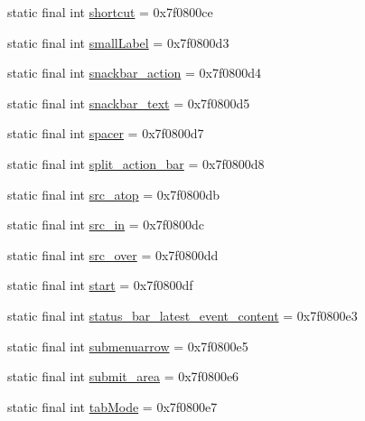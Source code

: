 \begin{DoxyCompactItemize}
static final int \mbox{\hyperlink{classandroid_1_1support_1_1design_1_1_r_1_1id_a9e39fbfaefbdc10d69bb31d13bf4959c}{shortcut}} = 0x7f0800ce
\item 
static final int \mbox{\hyperlink{classandroid_1_1support_1_1design_1_1_r_1_1id_ad269a4dcba96e834b17c3eb9e1900474}{small\+Label}} = 0x7f0800d3
\item 
static final int \mbox{\hyperlink{classandroid_1_1support_1_1design_1_1_r_1_1id_a073bc2a75a5089a68ae23abebbdb13f6}{snackbar\+\_\+action}} = 0x7f0800d4
\item 
static final int \mbox{\hyperlink{classandroid_1_1support_1_1design_1_1_r_1_1id_a1ac0d96909145afa11cdd3489a7adfb0}{snackbar\+\_\+text}} = 0x7f0800d5
\item 
static final int \mbox{\hyperlink{classandroid_1_1support_1_1design_1_1_r_1_1id_a29506b5ea15ea1e16972548834bfc1d9}{spacer}} = 0x7f0800d7
\item 
static final int \mbox{\hyperlink{classandroid_1_1support_1_1design_1_1_r_1_1id_a6a714dbfce5b2bd17ac6888b45bab492}{split\+\_\+action\+\_\+bar}} = 0x7f0800d8
\item 
static final int \mbox{\hyperlink{classandroid_1_1support_1_1design_1_1_r_1_1id_a07a92f1e2e517cc2410d6b29d15e61dd}{src\+\_\+atop}} = 0x7f0800db
\item 
static final int \mbox{\hyperlink{classandroid_1_1support_1_1design_1_1_r_1_1id_a7561532289295b8b13fecd179ea90562}{src\+\_\+in}} = 0x7f0800dc
\item 
static final int \mbox{\hyperlink{classandroid_1_1support_1_1design_1_1_r_1_1id_a736f123ee86e4183fcfb8bd3022ba9b8}{src\+\_\+over}} = 0x7f0800dd
\item 
static final int \mbox{\hyperlink{classandroid_1_1support_1_1design_1_1_r_1_1id_a0d737859bafd47bd0319c24213bf40ba}{start}} = 0x7f0800df
\item 
static final int \mbox{\hyperlink{classandroid_1_1support_1_1design_1_1_r_1_1id_a64ae3efa15896f2f8faa162f61413ed1}{status\+\_\+bar\+\_\+latest\+\_\+event\+\_\+content}} = 0x7f0800e3
\item 
static final int \mbox{\hyperlink{classandroid_1_1support_1_1design_1_1_r_1_1id_a09a95220083150a53dbebd8a8b21e4e1}{submenuarrow}} = 0x7f0800e5
\item 
static final int \mbox{\hyperlink{classandroid_1_1support_1_1design_1_1_r_1_1id_ab333d43c33d6df1b253b423f4c06b51b}{submit\+\_\+area}} = 0x7f0800e6
\item 
static final int \mbox{\hyperlink{classandroid_1_1support_1_1design_1_1_r_1_1id_a28f007351f00cb138e17395355f11f88}{tab\+Mode}} = 0x7f0800e7

\end{DoxyCompactItemize}
